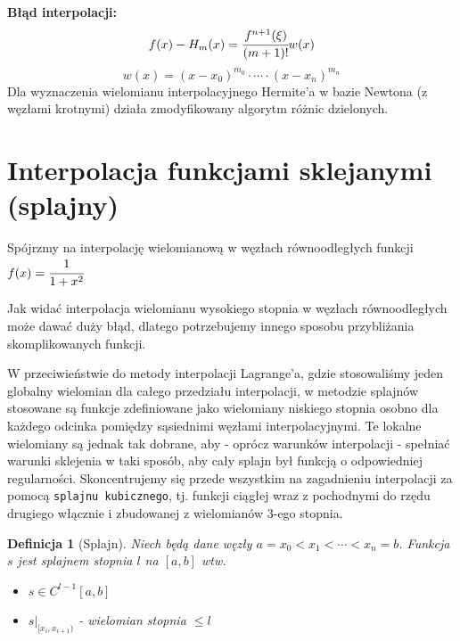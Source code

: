 \documentclass[hidelinks,a4paper,fleqn,oneside]{book}
\newtheorem{defi}{Definicja}
\begin{document}
\textbf{Błąd interpolacji:}
\[
f(x) - H_m(x) = \cfrac{f^{n+1}(\xi)}{(m+1)!}w(x)
\]
\[
	w(x) = (x-x_0)^{m_0} \cdot \cdots \cdot (x - x_n)^{m_n}
\]
Dla wyznaczenia wielomianu interpolacyjnego Hermite'a w bazie Newtona (z węzłami krotnymi) działa zmodyfikowany algorytm różnic dzielonych.

\section{Interpolacja funkcjami sklejanymi (splajny)}
Spójrzmy na interpolację wielomianową w węzłach równoodległych funkcji $f(x) = \cfrac{1}{1+x^2}$


Jak widać interpolacja wielomianu wysokiego stopnia w węzłach równoodległych może dawać duży błąd, dlatego potrzebujemy innego sposobu przybliżania skomplikowanych funkcji.

W przeciwieństwie do metody interpolacji Lagrange'a, gdzie stosowaliśmy jeden globalny wielomian dla całego przedziału interpolacji, w metodzie splajnów stosowane są funkcje zdefiniowane jako wielomiany niskiego stopnia osobno dla każdego odcinka pomiędzy sąsiednimi węzłami interpolacyjnymi. Te lokalne wielomiany są jednak tak dobrane, aby - oprócz warunków interpolacji - spełniać warunki sklejenia w taki sposób, aby cały splajn był funkcją o odpowiedniej regularności. Skoncentrujemy się przede wszystkim na zagadnieniu interpolacji za pomocą \texttt{splajnu kubicznego}, tj. funkcji ciągłej wraz z pochodnymi do rzędu drugiego włącznie i zbudowanej z wielomianów 3-ego stopnia. 

\begin{defi}[Splajn] Niech będą dane węzły $a = x_0 < x_1 < \cdots < x_n = b$. Funkcja $s$ jest splajnem stopnia $l$ na $[a, b]$ wtw. \begin{itemize}
\item $s \in C^{l-1}[a, b]$
\item $s|_{[x_i, x_{i+1})}$ - wielomian stopnia $\leq l$
\end{itemize}
\end{defi}
\end{document}
